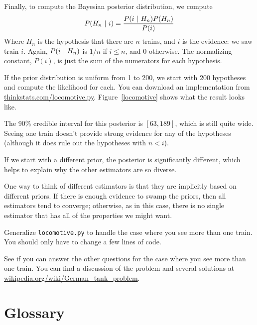 \documentclass[12pt]{book}
\begin{document}
Finally, to compute the Bayesian posterior distribution, we compute
%
\[ P(H_n ~|~ i) = \frac{P(i ~|~ H_n) P(H_n)}{P(i)} \]
%
Where $H_n$ is the hypothesis that there are $n$ trains, and $i$ is
the evidence: we saw train $i$.  Again, $P(i ~|~ H_n)$
is $1/n$ if $i \le n$, and 0 otherwise.  The normalizing constant,
$P(i)$, is just the sum of the numerators for each hypothesis.


If the prior distribution is uniform from 1 to 200, we start with 200
hypotheses and compute the likelihood for each.  You can download an
implementation from
\url{thinkstats.com/locomotive.py}.  Figure~\ref{locomotive} shows
what the result looks like.



The 90\% credible interval for this posterior is $[63, 189]$, which
is still quite wide.  Seeing one train doesn't provide strong evidence
for any of the hypotheses (although it does rule out the hypotheses
with $n < i$).


If we start with a different prior, the posterior is significantly
different, which helps to explain why the other estimators are so
diverse.

One way to think of different estimators is that they are implicitly
based on different priors.  If there is enough evidence to swamp the
priors, then all estimators tend to converge; otherwise, as in this
case, there is no single estimator that has all of the properties we
might want.

\begin{exercise}
Generalize \verb"locomotive.py" to handle the case where you
see more than one train.  You should only have to
change a few lines of code.


See if you can answer the other questions for the case where you
see more than one train.  You can find a discussion of the problem
and several solutions at
\url{wikipedia.org/wiki/German_tank_problem}.

\end{exercise}

\section{Glossary}
\end{document}
